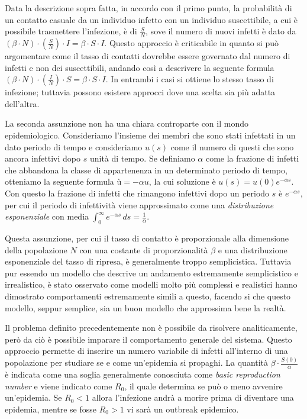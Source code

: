 Data la descrizione sopra fatta, in accordo con il primo punto, la probabilità di un contatto casuale da un individuo 
infetto con un individuo suscettibile, a cui è possibile trasmettere l'infezione, è di $\frac{S}{N}$, sove il numero di nuovi 
infetti è dato da $(\beta \cdot N) \cdot (\frac{S}{N}) \cdot I = \beta \cdot S \cdot I$. Questo approccio è criticabile in quanto 
si può argomentare come il tasso di contatti dovrebbe essere governato dal numero di infetti e non dei suscettibili, andando 
così a descrivere la seguente formula $(\beta \cdot N) \cdot (\frac{I}{N}) \cdot S = \beta \cdot S \cdot I$. In entrambi i casi 
si ottiene lo stesso tasso di infezione; tuttavia possono esistere approcci dove una scelta sia più adatta dell'altra.

La seconda assunzione non ha una chiara controparte con il mondo epidemiologico. Consideriamo l'insieme dei membri che sono stati infettati 
in un dato periodo di tempo e consideriamo $u(s)$ come il numero di questi che sono ancora infettivi dopo $s$ unità di tempo. Se definiamo 
$\alpha$ come la frazione di infetti che abbandona la classe di appartenenza in un determinato periodo di tempo, otteniamo la seguente formula
$ù = - \alpha u$, la cui soluzione è $u(s) = u(0) e^{-\alpha s}$. Con questo la frazione di infetti che rimangono infettivi dopo un periodo 
$s$ è $e^{-\alpha s}$, per cui il periodo di infettività viene approssimato come una \emph{distribuzione esponenziale} con media 
$\int_{0}^{\infty} e^{-\alpha s} \,ds = \frac{1}{\alpha}$.

Questa assunzione, per cui il tasso di contatto è proporzionale alla dimensione della popolazione $N$ con una costante di 
proporzionalità $\beta$  e una distribuzione esponenziale del tasso di ripresa, è generalmente troppo semplicistica. Tuttavia pur essendo 
un modello che descrive un andamento estremamente semplicistico e irrealistico, è stato osservato come modelli molto più complessi e realistici 
hanno dimostrato comportamenti estremamente simili a questo, facendo si che questo modello, seppur semplice, sia un buon modello che approssima bene 
la realtà.

Il problema definito precedentemente non è possibile da risolvere analiticamente, però da ciò è possibile imparare il comportamento generale del sistema.
Questo approccio permette di inserire un numero variabile di infetti all'interno di una popolazione per studiare se e come 
un'epidemia si propaghi. La quantità $\beta \cdot \frac{S(0)}{\alpha}$ è indicata come una soglia generalmente conosciuta 
come \emph{basic reproduction number} e viene indicato come $R_0$, il quale determina se può o meno avvenire un'epidemia. 
Se $R_0 < 1$ allora l'infezione andrà a morire prima di diventare una epidemia, mentre se fosse $R_0 > 1$ vi sarà 
un outbreak epidemico.

